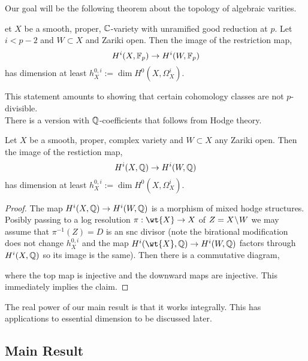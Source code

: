 \documentclass[12pt]{article}
\begin{document}
Our goal will be the following theorem about the topology of algebraic varities. 

\begin{theorem}
et $X$ be a smooth, proper, $\mathbb{C}$-variety with unramified good reduction at $p$. Let $i < p - 2$ and $W \subset X$ and Zariki open. Then the image of the restriction map,
\[ H^i(X, \mathbb{F}_p) \to H^i(W, \mathbb{F}_p) \]
has dimension at least $h_X^{0,i} := \dim H^0(X, \Omega_X^i)$.
\end{theorem}

This statement amounts to showing that certain cohomology classes are not $p$-divisible.
\bigskip\\
There is a version with $\mathbb{Q}$-coefficients that follows from Hodge theory.

\begin{theorem}
Let $X$ be a smooth, proper, complex variety and $W \subset X$ any Zariki open. Then the image of the restiction map,
\[ H^i(X, \mathbb{Q}) \to H^i(W, \mathbb{Q}) \]
has dimension at least $h_X^{0,i} := \dim H^0(X, \Omega_X^i)$.
\end{theorem}

\begin{proof}
The map $H^i(X, \mathbb{Q}) \to H^i(W, \mathbb{Q})$ is a morphism of mixed hodge structures. Posibly passing to a log resolution $\pi : \wt{X} \to X$ of $Z = X \! \setminus \! W$ we may assume that $\pi^{-1}(Z) = D$ is an snc divisor (note the birational modification does not change $h^{0,i}_X$ and the map $H^i(\wt{X}, \QQ) \to H^i(W, \QQ)$ factors through $H^i(X, \mathbb{Q})$ so its image is the same). Then there is a commutative diagram,
\begin{center}
\end{center}
where the top map is injective and the downward maps are injective. This immediately implies the claim. 
\end{proof}

The real power of our main result is that it works integrally. This has applications to essential dimension to be discussed later.

\subsection{Main Result}
\end{document}
